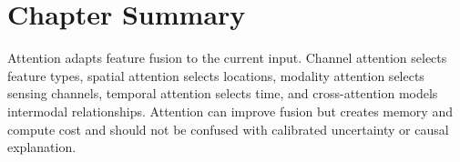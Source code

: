 \section{Chapter Summary}

Attention adapts feature fusion to the current input. Channel attention selects feature types, spatial attention selects locations, modality attention selects sensing channels, temporal attention selects time, and cross-attention models intermodal relationships. Attention can improve fusion but creates memory and compute cost and should not be confused with calibrated uncertainty or causal explanation.
